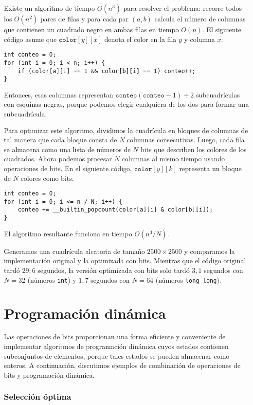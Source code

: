 Existe un algoritmo de tiempo $O(n^3)$ para resolver el problema:
recorre todos los $O(n^2)$ pares de filas y para cada par
$(a, b)$ calcula el número de columnas que contienen un cuadrado negro
en ambas filas en tiempo $O(n)$.
El siguiente código asume que $\texttt{color}[y][x]$
denota el color en la fila $y$ y columna $x$:
\begin{lstlisting}
int conteo = 0;
for (int i = 0; i < n; i++) {
    if (color[a][i] == 1 && color[b][i] == 1) conteo++;
}
\end{lstlisting}
Entonces, esas columnas
representan $\texttt{conteo}(\texttt{conteo}-1)\div2$ subcuadrículas con esquinas negras,
porque podemos elegir cualquiera de los dos para formar una subcuadrícula.

Para optimizar este algoritmo, dividimos la cuadrícula en bloques
de columnas de tal manera que cada bloque consta de $N$
columnas consecutivas. Luego, cada fila se almacena como
una lista de números de $N$ bits que describen los colores
de los cuadrados. Ahora podemos procesar $N$ columnas al mismo tiempo
usando operaciones de bits. En el siguiente código,
$\texttt{color}[y][k]$ representa
un bloque de $N$ colores como bits.
\begin{lstlisting}
int conteo = 0;
for (int i = 0; i <= n / N; i++) {
    conteo += __builtin_popcount(color[a][i] & color[b][i]);
}
\end{lstlisting}
El algoritmo resultante funciona en tiempo $O(n^3/N)$.

Generamos una cuadrícula aleatoria de tamaño $2500 \times 2500$
y comparamos la implementación original y la optimizada con bits.
Mientras que el código original tardó $29,6$ segundos,
la versión optimizada con bits solo tardó $3,1$ segundos
con $N=32$ (números \texttt{int}) y $1,7$ segundos
con $N=64$ (números \texttt{long long}).

\section{Programación dinámica}

Las operaciones de bits proporcionan una forma eficiente y conveniente
de implementar algoritmos de programación dinámica
cuyos estados contienen subconjuntos de elementos,
porque tales estados se pueden almacenar como enteros.
A continuación, discutimos ejemplos de combinación
de operaciones de bits y programación dinámica.

\subsubsection{Selección óptima}

